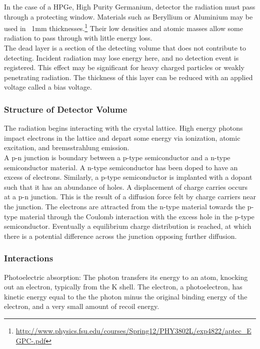 \documentclass[12pt]{article}
\begin{document}
\begin{doublespacing}
In the case of a HPGe, High Purity Germanium, detector the radiation must pass through a protecting window. 
Materials such as Beryllium or Aluminium may be used in ~1mm thicknesses.\footnote{\url{http://www.physics.fsu.edu/courses/Spring12/PHY3802L/exp4822/aptec_EGPC-.pdf}} 
Their low densities and atomic masses allow some radiation to pass through with little energy loss.
\\

The dead layer is a section of the detecting volume that does not contribute to detecting. 
Incident radiation may lose energy here, and no detection event is registered. 
This effect may be significant for heavy charged particles or weakly penetrating radiation.
The thickness of this layer can be reduced with an applied voltage called a bias voltage.
\\


\subsubsection{Structure of Detector Volume}

The radiation begins interacting with the crystal lattice. 
High energy photons impact electrons in the lattice and depart some energy via ionization, atomic excitation, and bremsstrahlung emission. 
\\

A p-n junction is boundary between a p-type semiconductor and a n-type semiconductor material. 
A n-type semiconductor has been doped to have an excess of electrons. 
Similarly, a p-type semiconductor is implanted with a dopant such that it has an abundance of holes. 
A displacement of charge carries occurs at a p-n junction. 
This is the result of a diffusion force felt by charge carriers near the junction. 
The electrons are attracted from the n-type material towards the p-type material through the Coulomb interaction with the excess hole in the p-type semiconductor. 
Eventually a equilibrium charge distribution is reached, at which there is a potential difference across the junction opposing further diffusion.
\\


\subsubsection{Interactions}
Photoelectric absorption: The photon transfers its energy to an atom, knocking out an electron, typically from the K shell. 
The electron, a photoelectron, has kinetic energy equal to the the photon minus the original binding energy of the electron, and a very small amount of recoil energy.


\end{doublespacing}
\end{document}
